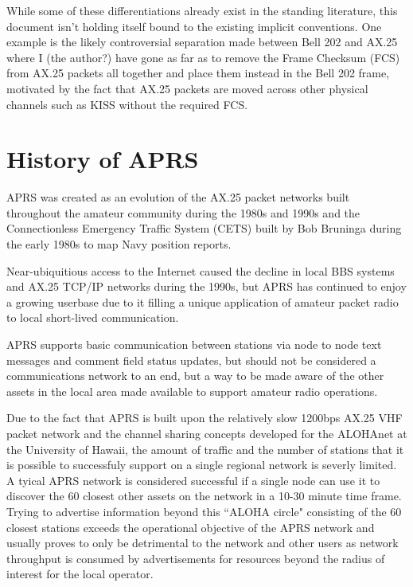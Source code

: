 While some of these differentiations already exist in the standing literature,
this document isn't holding itself bound to the existing implicit conventions.
One example is the likely controversial separation made between Bell 202 and 
AX.25 where I (the author?) have gone as far as to
remove the Frame Checksum (FCS) from AX.25 packets all together and place them
instead in the Bell 202 frame, motivated by the fact that AX.25 packets are moved
across other physical channels such as KISS without the required FCS.

\section{History of APRS}

APRS was created as an evolution of the AX.25 packet networks
built throughout the amateur community during the 1980s and 1990s and 
the Connectionless Emergency Traffic System (CETS) built by 
Bob Bruninga during the early 1980s to map Navy position reports.

Near-ubiquitious access to the Internet caused the decline in local BBS 
systems and AX.25 TCP/IP networks during the 1990s, but APRS has 
continued to enjoy a growing userbase due to it filling a unique 
application of amateur packet radio to local short-lived communication.

APRS supports basic communication between stations via node to node 
text messages and comment field status updates, but should not be 
considered a communications network to an end, but a way to be made aware
of the other assets in the local area made available to support amateur 
radio operations.

Due to the fact that APRS is built upon the relatively slow 
1200bps AX.25 VHF packet
network and the channel sharing concepts developed for the ALOHAnet at
the University of Hawaii, the amount of 
traffic and the number of stations that it is possible to successfuly 
support on a single regional network is severly limited. 
A tyical APRS network is considered successful if a single node
can use it to discover the 60 closest other assets on the network in a
10-30 minute time frame. Trying to advertise information beyond this
``ALOHA circle" consisting of the 60 closest stations exceeds the 
operational objective of the APRS network and usually proves to only be 
detrimental to the network and other users as network throughput is 
consumed by advertisements for 
resources beyond the radius of interest for the local operator.

